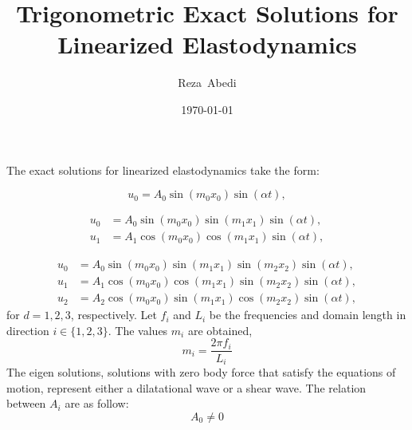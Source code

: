 \documentclass[12pt]{article}
\begin{document}
\title{Trigonometric Exact Solutions for Linearized Elastodynamics}
\author{Reza~Abedi}
\date{\today}%
\maketitle




The exact solutions for linearized elastodynamics take the form:

\begin{equation}
u_0 = A_0 \sin (m_0 x_0) \sin (\alpha t),
\end{equation}

\begin{subequations}
\begin{align}
u_0 &= A_0 \sin (m_0 x_0) \sin (m_1 x_1) \sin (\alpha t), \\
u_1 &= A_1 \cos (m_0 x_0) \cos (m_1 x_1) \sin (\alpha t), 
\end{align}
\end{subequations}

\begin{subequations}
\begin{align}
u_0 &= A_0 \sin (m_0 x_0) \sin (m_1 x_1) \sin (m_2 x_2) \sin (\alpha t), \\
u_1 &= A_1 \cos (m_0 x_0) \cos (m_1 x_1) \sin (m_2 x_2) \sin (\alpha t), \\
u_2 &= A_2 \cos (m_0 x_0) \sin (m_1 x_1) \cos (m_2 x_2) \sin (\alpha t), 
\end{align}
\end{subequations}
%
for $d = 1, 2, 3$, respectively. Let $f_i$ and $L_i$ be the frequencies and domain length in direction $i \in \{1, 2, 3\}$. The values $m_i$ are obtained,
%
\begin{equation}
m_i = \frac{2 \pi f_i}{L_i}
\end{equation}
% 
The eigen solutions, solutions with zero body force that satisfy the equations of motion, represent either a dilatational wave or a shear wave. The relation between $A_i$ are as follow:
%
\begin{equation}
A_0 \neq 0
\end{equation}
\end{document}
